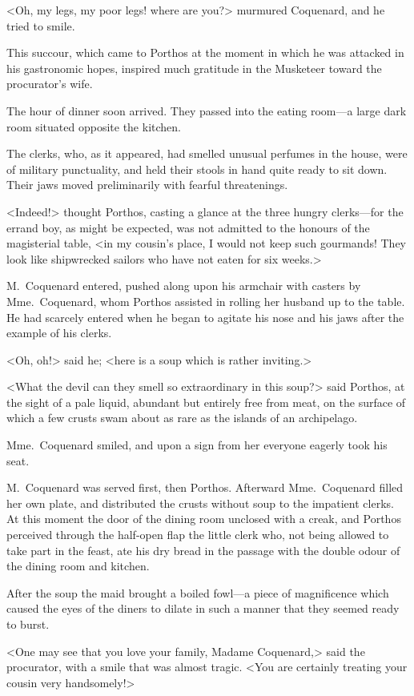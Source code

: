 <Oh, my legs, my poor legs! where are you?> murmured Coquenard, and he tried to smile. 

This succour, which came to Porthos at the moment in which he was attacked in his gastronomic hopes, inspired much gratitude in the Musketeer toward the procurator's wife. 

The hour of dinner soon arrived. They passed into the eating room—a large dark room situated opposite the kitchen. 

The clerks, who, as it appeared, had smelled unusual perfumes in the house, were of military punctuality, and held their stools in hand quite ready to sit down. Their jaws moved preliminarily with fearful threatenings. 

<Indeed!> thought Porthos, casting a glance at the three hungry clerks—for the errand boy, as might be expected, was not admitted to the honours of the magisterial table, <in my cousin's place, I would not keep such gourmands! They look like shipwrecked sailors who have not eaten for six weeks.> 

M.~Coquenard entered, pushed along upon his armchair with casters by Mme.~Coquenard, whom Porthos assisted in rolling her husband up to the table. He had scarcely entered when he began to agitate his nose and his jaws after the example of his clerks. 

<Oh, oh!> said he; <here is a soup which is rather inviting.> 

<What the devil can they smell so extraordinary in this soup?> said Porthos, at the sight of a pale liquid, abundant but entirely free from meat, on the surface of which a few crusts swam about as rare as the islands of an archipelago. 

Mme.~Coquenard smiled, and upon a sign from her everyone eagerly took his seat. 

M.~Coquenard was served first, then Porthos. Afterward Mme.~Coquenard filled her own plate, and distributed the crusts without soup to the impatient clerks. At this moment the door of the dining room unclosed with a creak, and Porthos perceived through the half-open flap the little clerk who, not being allowed to take part in the feast, ate his dry bread in the passage with the double odour of the dining room and kitchen. 

After the soup the maid brought a boiled fowl—a piece of magnificence which caused the eyes of the diners to dilate in such a manner that they seemed ready to burst. 

<One may see that you love your family, Madame Coquenard,> said the procurator, with a smile that was almost tragic. <You are certainly treating your cousin very handsomely!> 

